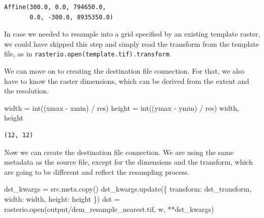 \documentclass[
  letterpaper,
]{krantz}
\newenvironment{Shaded}{\begin{snugshade}}{\end{snugshade}}
\newcommand{\BuiltInTok}[1]{\textcolor[rgb]{0.00,0.23,0.31}{#1}}
\newcommand{\NormalTok}[1]{\textcolor[rgb]{0.00,0.23,0.31}{#1}}
\newcommand{\OperatorTok}[1]{\textcolor[rgb]{0.37,0.37,0.37}{#1}}
\newcommand{\StringTok}[1]{\textcolor[rgb]{0.13,0.47,0.30}{#1}}
\begin{document}
\begin{verbatim}
Affine(300.0, 0.0, 794650.0,
       0.0, -300.0, 8935350.0)
\end{verbatim}

In case we needed to resample into a grid specified by an existing
template raster, we could have skipped this step and simply read the
transform from the template file, as in
\texttt{rasterio.open(\textquotesingle{}template.tif\textquotesingle{}).transform}.

We can move on to creating the destination file connection. For that, we
also have to know the raster dimensions, which can be derived from the
extent and the resolution.

\begin{Shaded}
\begin{Highlighting}[]
\NormalTok{width }\OperatorTok{=} \BuiltInTok{int}\NormalTok{((xmax }\OperatorTok{{-}}\NormalTok{ xmin) }\OperatorTok{/}\NormalTok{ res)}
\NormalTok{height }\OperatorTok{=} \BuiltInTok{int}\NormalTok{((ymax }\OperatorTok{{-}}\NormalTok{ ymin) }\OperatorTok{/}\NormalTok{ res)}
\NormalTok{width, height}
\end{Highlighting}
\end{Shaded}

\begin{verbatim}
(12, 12)
\end{verbatim}

Now we can create the destination file connection. We are using the same
metadata as the source file, except for the dimensions and the
transform, which are going to be different and reflect the resampling
process.

\begin{Shaded}
\begin{Highlighting}[]
\NormalTok{dst\_kwargs }\OperatorTok{=}\NormalTok{ src.meta.copy()}
\NormalTok{dst\_kwargs.update(\{}
    \StringTok{\textquotesingle{}transform\textquotesingle{}}\NormalTok{: dst\_transform,}
    \StringTok{\textquotesingle{}width\textquotesingle{}}\NormalTok{: width,}
    \StringTok{\textquotesingle{}height\textquotesingle{}}\NormalTok{: height}
\NormalTok{\})}
\NormalTok{dst }\OperatorTok{=}\NormalTok{ rasterio.}\BuiltInTok{open}\NormalTok{(}\StringTok{\textquotesingle{}output/dem\_resample\_nearest.tif\textquotesingle{}}\NormalTok{, }\StringTok{\textquotesingle{}w\textquotesingle{}}\NormalTok{, }\OperatorTok{**}\NormalTok{dst\_kwargs)}
\end{Highlighting}
\end{Shaded}
\end{document}
